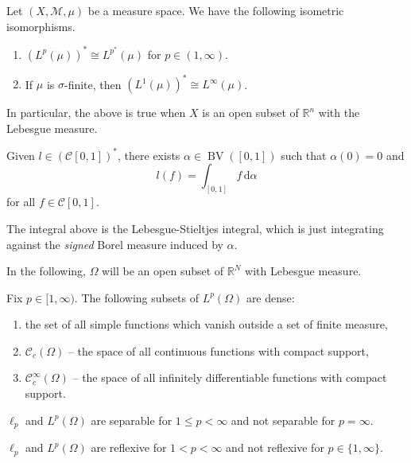 \documentclass[12pt]{article}	%
\begin{document}
\begin{thm}
	Let $(X, \mathcal{M}, \mu)$ be a measure space. We have the following isometric isomorphisms.
	\begin{enumerate}
		\item $(L^{p}(\mu))^{\ast} \cong L^{p^{\ast}}(\mu)$ for $p \in (1, \infty)$. 
		\item If $\mu$ is $\sigma$-finite, then $(L^{1}(\mu))^{\ast} \cong L^{\infty}(\mu)$.
	\end{enumerate}
	In particular, the above is true when $X$ is an open subset of $\mathbb{R}^{n}$ with the Lebesgue measure.
\end{thm}

\begin{thm}[Riesz]
	Given $l \in (\mathcal{C}[0, 1])^{\ast}$, there exists $\alpha \in \operatorname{BV}([0, 1])$ such that $\alpha(0) = 0$ and
	\begin{equation*} 
		l(f) = \int_{[0, 1]} f \,{\mathrm{d}}\alpha
	\end{equation*}
	for all $f \in \mathcal{C}[0, 1]$.
\end{thm}
The integral above is the Lebesgue-Stieltjes integral, which is just integrating against the \emph{signed} Borel measure induced by $\alpha$.

In the following, $\Omega$ will be an open subset of $\mathbb{R}^{N}$ with Lebesgue measure.

\begin{thm}
	Fix $p \in [1, \infty)$. The following subsets of $L^{p}(\Omega)$ are dense:
	\begin{enumerate}
		\item the set of all simple functions which vanish outside a set of finite measure,
		\item $\mathcal{C}_{c}(\Omega)$ -- the space of all continuous functions with compact support,
		\item $\mathcal{C}_{c}^{\infty}(\Omega)$ -- the space of all infinitely differentiable functions with compact support.
	\end{enumerate}
\end{thm}

\begin{thm}
	$\ell_{p}$ and $L^{p}(\Omega)$ are separable for $1 \le p < \infty$ and not separable for $p = \infty$.
\end{thm}

\begin{thm}
	$\ell_{p}$ and $L^{p}(\Omega)$ are reflexive for $1 < p < \infty$ and not reflexive for $p \in \{1, \infty\}$.
\end{thm}
\end{document}
